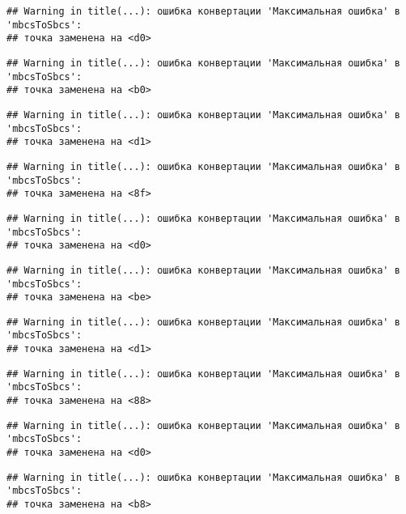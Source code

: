 \documentclass[
]{article}
\begin{document}
\begin{verbatim}
## Warning in title(...): ошибка конвертации 'Максимальная ошибка' в 'mbcsToSbcs':
## точка заменена на <d0>
\end{verbatim}

\begin{verbatim}
## Warning in title(...): ошибка конвертации 'Максимальная ошибка' в 'mbcsToSbcs':
## точка заменена на <b0>
\end{verbatim}

\begin{verbatim}
## Warning in title(...): ошибка конвертации 'Максимальная ошибка' в 'mbcsToSbcs':
## точка заменена на <d1>
\end{verbatim}

\begin{verbatim}
## Warning in title(...): ошибка конвертации 'Максимальная ошибка' в 'mbcsToSbcs':
## точка заменена на <8f>
\end{verbatim}

\begin{verbatim}
## Warning in title(...): ошибка конвертации 'Максимальная ошибка' в 'mbcsToSbcs':
## точка заменена на <d0>
\end{verbatim}

\begin{verbatim}
## Warning in title(...): ошибка конвертации 'Максимальная ошибка' в 'mbcsToSbcs':
## точка заменена на <be>
\end{verbatim}

\begin{verbatim}
## Warning in title(...): ошибка конвертации 'Максимальная ошибка' в 'mbcsToSbcs':
## точка заменена на <d1>
\end{verbatim}

\begin{verbatim}
## Warning in title(...): ошибка конвертации 'Максимальная ошибка' в 'mbcsToSbcs':
## точка заменена на <88>
\end{verbatim}

\begin{verbatim}
## Warning in title(...): ошибка конвертации 'Максимальная ошибка' в 'mbcsToSbcs':
## точка заменена на <d0>
\end{verbatim}

\begin{verbatim}
## Warning in title(...): ошибка конвертации 'Максимальная ошибка' в 'mbcsToSbcs':
## точка заменена на <b8>
\end{verbatim}
\end{document}
